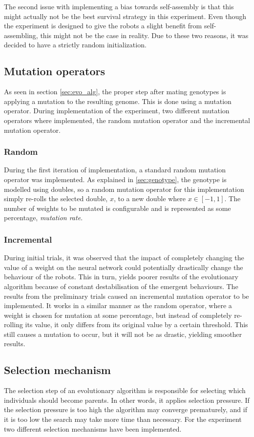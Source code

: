 The second issue with implementing a bias towards self-assembly is that this might actually not be the best survival strategy in this experiment.
Even though the experiment is designed to give the robots a slight benefit from self-assembling, this might not be the case in reality.
Due to these two reasons, it was decided to have a strictly random initialization.

\subsection{Mutation operators}
As seen in section \ref{sec:evo_alg}, the proper step after mating genotypes is applying a mutation to the resulting genome.
This is done using a mutation operator.
During implementation of the experiment, two different mutation operators where implemented, the random mutation operator and the incremental mutation operator.

\subsubsection{Random}
During the first iteration of implementation, a standard random mutation operator was implemented.
As explained in \ref{sec:genotype}, the genotype is modelled using doubles, so a random mutation operator for this implementation simply re-rolls the selected double, $x$, to a new double where $x \in [-1, 1]$. 
The number of weights to be mutated is configurable and is represented as some percentage, \emph{mutation rate}.

\subsubsection{Incremental}
During initial trials, it was observed that the impact of completely changing the value of a weight on the neural network could potentially drastically change the behaviour of the robots.
This in turn, yields poorer results of the evolutionary algorithm because of constant destabilisation of the emergent behaviours.
The results from the preliminary trials caused an incremental mutation operator to be implemented.
It works in a similar manner as the random operator, where a weight is chosen for mutation at some percentage, but instead of completely re-rolling its value, it only differs from its original value by a certain threshold.
This still causes a mutation to occur, but it will not be as drastic, yielding smoother results. 

\subsection{Selection mechanism}
	The selection step of an evolutionary algorithm is responsible for selecting which individuals should become parents.
	In other words, it applies selection pressure.
	If the selection pressure is too high the algorithm may converge prematurely, and if it is too low the search may take more time than necessary.
	For the experiment two different selection mechanisms have been implemented.
